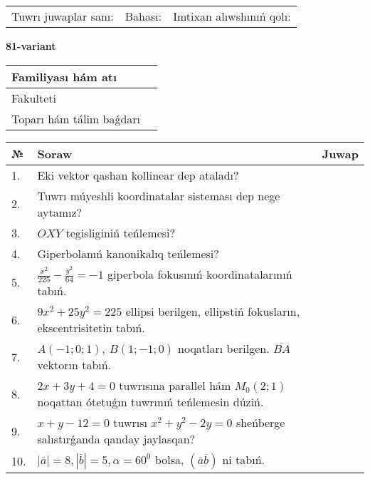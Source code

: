 \documentclass{article}
\begin{document}
\vspace{1cm}

\begin{tabular}{lll}
Tuwrı juwaplar sanı: \underline{\hspace{1.5cm}} & 
Bahası: \underline{\hspace{1.5cm}} & 
Imtixan alıwshınıń qolı: \underline{\hspace{2cm}} \\
\end{tabular}

\egroup

\newpage


\textbf{81-variant}\\

\bgroup
\def\arraystretch{1.6} %

\begin{tabular}{|m{5.7cm}|m{9.5cm}|}
\hline
Familiyası hám atı & \\
\hline
Fakulteti  & \\
\hline
Toparı hám tálim baǵdarı  & \\
\hline
\end{tabular}

\vspace{1cm}

\begin{tabular}{|m{0.7cm}|m{10cm}|m{4cm}|}
\hline
№ & Soraw & Juwap \\
\hline
1. & Eki vektor qashan kollinear dep ataladı? &  \\
\hline
2. & Tuwrı múyeshli koordinatalar sisteması dep nege aytamız? &  \\
\hline
3. & $OXY$ tegisliginiń teńlemesi? &  \\
\hline
4. & Giperbolanıń kanonikalıq teńlemesi? &  \\
\hline
5. & $\frac{x^{2}}{225}-\frac{y^{2}}{64}=-1$ giperbola fokusınıń koordinatalarınıń tabıń. &  \\
\hline
6. & $9x^{2}+25y^{2}=225$ ellipsi berilgen, ellipstiń fokusların, ekscentrisitetin tabıń. &  \\
\hline
7. & $A (-1;0;1),\ B (1;-1;0)$ noqatları berilgen. $\overline{BA}$ vektorın tabıń. &  \\
\hline
8. & $2x+3y+4=0$ tuwrısına parallel hám $M_{0} (2;1)$ noqattan ótetuǵın tuwrınıń teńlemesin dúziń. &  \\
\hline
9. & $x+y-12=0$ tuwrısı $x^{2}+y^{2}-2y=0$ sheńberge salıstırǵanda qanday jaylasqan? &  \\
\hline
10. & $\left| \overline{a} \right|=8, \left| \overline{b} \right|=5, \alpha=60^{0}$ bolsa, $( \overline{a}\overline{b} )$ ni tabıń. &  \\
\hline
\end{tabular}
\end{document}
